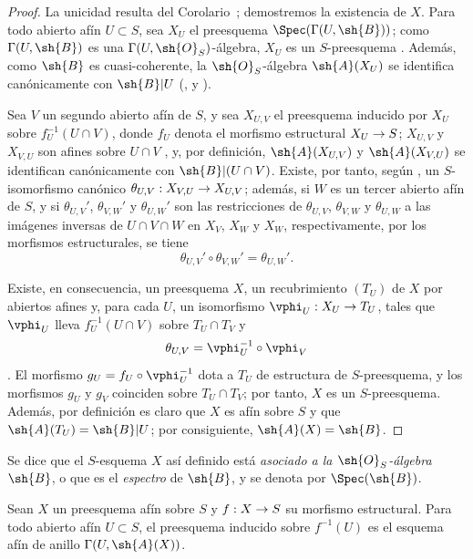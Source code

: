 \documentclass[oneside,10pt]{amsart}
\makeatletter
\newcommand{\ega@arrow}[2]{\mathchoice{#1}{#2}{#2}{#2}}
\renewcommand{\to}{\ega@arrow{\longrightarrow}{\rightarrow}}
\let\EGAOriginalLabel\label
\renewcommand{\label}[1]{\phantomsection\EGAOriginalLabel{#1}}
\makeatother
\begin{document}
\begin{proof}
La unicidad resulta del Corolario~; demostremos la existencia de $X$.
Para todo abierto afín $U\subset S$, sea $X_U$ el preesquema $\Spec(\Gamma(U,\sh{B}))$; como $\Gamma(U,\sh{B})$ es una $\Gamma(U,\sh{O}_S)$-álgebra, $X_U$ es un $S$-preesquema .
Además, como $\sh{B}$ es cuasi-coherente, la $\sh{O}_S$-álgebra $\sh{A}(X_U)$ se identifica canónicamente con $\sh{B}|U$ (,  y ).

Sea $V$ un segundo abierto afín de $S$, y sea $X_{U,V}$ el preesquema inducido por $X_U$ sobre $f_U^{-1}(U\cap V)$, donde $f_U$ denota el morfismo estructural $X_U\to S$; $X_{U,V}$ y $X_{V,U}$ son afines sobre $U\cap V$ , y, por definición, $\sh{A}(X_{U,V})$ y $\sh{A}(X_{V,U})$ se identifican canónicamente con $\sh{B}|(U\cap V)$.
Existe, por tanto, según , un $S$-isomorfismo canónico $\theta_{U,V}:X_{V,U}\to X_{U,V}$; además, si $W$ es un tercer abierto afín de $S$, y si $\theta_{U,V}'$, $\theta_{V,W}'$ y $\theta_{U,W}'$ son las restricciones de $\theta_{U,V}$, $\theta_{V,W}$ y $\theta_{U,W}$ a las imágenes inversas de $U\cap V\cap W$ en $X_V$, $X_W$ y $X_W$, respectivamente, por los morfismos estructurales, se tiene
\[
  \theta_{U,V}'\circ\theta_{V,W}'=\theta_{U,W}'.
\]

Existe, en consecuencia, un preesquema $X$, un recubrimiento $(T_U)$ de $X$ por abiertos afines y, para cada $U$, un isomorfismo $\vphi_U:X_U\to T_U$, tales que $\vphi_U$ lleva $f_U^{-1}(U\cap V)$ sobre $T_U\cap T_V$ y
\[
  \theta_{U,V}=\vphi_U^{-1}\circ\vphi_V
\]
.
El morfismo $g_U=f_U\circ\vphi_U^{-1}$ dota a $T_U$ de estructura de $S$-preesquema, y los morfismos $g_U$ y $g_V$ coinciden sobre $T_U\cap T_V$; por tanto, $X$ es un $S$-preesquema.
Además, por definición es claro que $X$ es afín sobre $S$ y que $\sh{A}(T_U)=\sh{B}|U$; por consiguiente, $\sh{A}(X)=\sh{B}$.
\end{proof}

Se dice que el $S$-esquema $X$ así definido está \emph{asociado a la $\sh{O}_S$-álgebra $\sh{B}$}, o que es el \emph{espectro} de $\sh{B}$, y se denota por $\Spec(\sh{B})$.

\begin{corollary}[1.3.2]
\label{II.1.3.2}
Sean $X$ un preesquema afín sobre $S$ y $f:X\to S$ su morfismo estructural.
Para todo abierto afín $U\subset S$, el preesquema inducido sobre $f^{-1}(U)$ es el esquema afín de anillo $\Gamma(U,\sh{A}(X))$.
\end{corollary}
\end{document}
